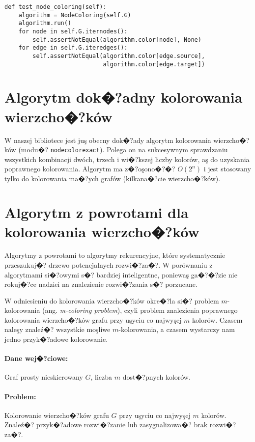 \documentclass[12pt,a4paper]{mwrep}
\begin{document}
\begin{lstlisting}[caption={Test poprawno�?ci kolorowania wierzcho�?ków.},
label={lst:proper_vertex_coloring}]
def test_node_coloring(self):
    algorithm = NodeColoring(self.G)
    algorithm.run()
    for node in self.G.iternodes():
        self.assertNotEqual(algorithm.color[node], None)
    for edge in self.G.iteredges():
        self.assertNotEqual(algorithm.color[edge.source],
                            algorithm.color[edge.target])
\end{lstlisting}


\section{Algorytm dok�?adny kolorowania wierzcho�?ków}
\label{sec:exact_node_coloring}

W naszej bibliotece jest juş obecny dok�?ady algorytm kolorowania
wierzcho�?ków (modu�? \lstinline|nodecolorexact|). 
Polega on na sukcesywnym sprawdzaniu wszystkich
kombinacji dwóch, trzech i wi�?kszej liczby kolorów,
aş do uzyskania poprawnego kolorowania.
Algorytm ma z�?oşono�?�? $O(2^n)$ i jest stosowany tylko do kolorowania
ma�?ych grafów (kilkana�?cie wierzcho�?ków).


\section{Algorytm z powrotami dla kolorowania wierzcho�?ków}
\label{sec:backtracking_node_coloring}

Algorytmy z powrotami to algorytmy rekurencyjne, które systematycznie
przeszukuj�? drzewo potencjalnych rozwi�?za�?.
W porównaniu z algorytmami si�?owymi s�? bardziej inteligentne,
poniewaş ga�?�?zie nie rokuj�?ce nadziei na znalezienie rozwi�?zania
s�? porzucane.

W odniesieniu do kolorowania wierzcho�?ków okre�?la si�? problem
$m$-kolorowania (ang. \emph{m-coloring problem}),
czyli problem znalezienia poprawnego kolorowania wierzcho�?ków
grafu przy uşyciu co najwyşej $m$ kolorów.
Czasem naleşy znaleź�? wszystkie moşliwe $m$-kolorowania,
a czasem wystarczy nam jedno przyk�?adowe kolorowanie.

\paragraph{Dane wej�?ciowe:} Graf prosty nieskierowany $G$,
liczba $m$ dost�?pnych kolorów.

\paragraph{Problem:} Kolorowanie wierzcho�?ków grafu $G$ przy uşyciu
co najwyşej $m$ kolorów. Znaleź�? przyk�?adowe rozwi�?zanie lub
zasygnalizowa�? brak rozwi�?za�?.
\end{document}
